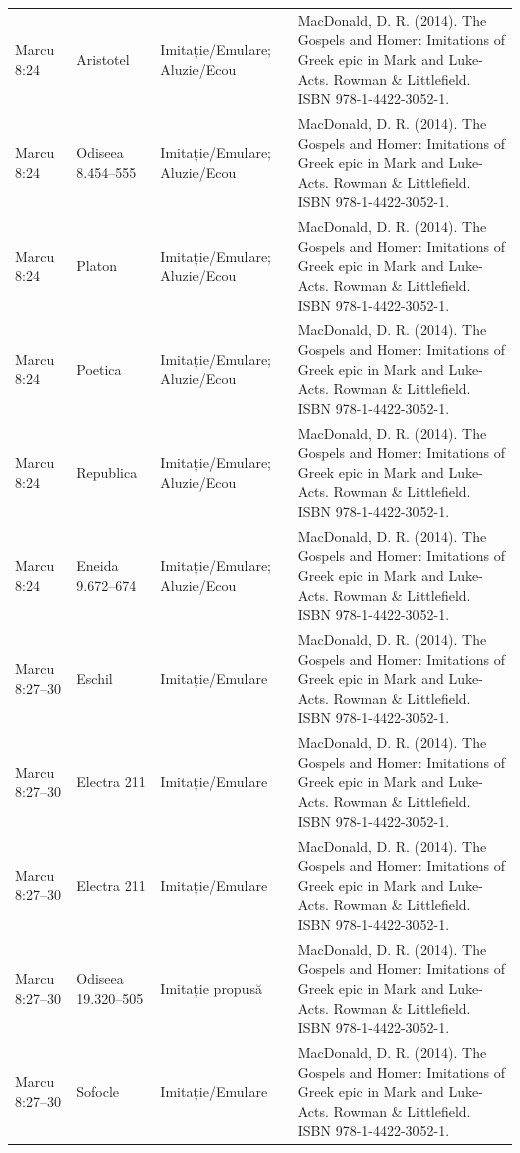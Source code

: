 \documentclass[12pt,a4paper,twoside,openany]{book}
\begin{document}
\begin{longtable}{L{1.4cm}L{1.7cm}L{3.1cm}L{8.4cm}}
Marcu 8:24 & Aristotel & Imitație/Emulare; Aluzie/Ecou & MacDonald, D. R. (2014). The Gospels and Homer: Imitations of Greek epic in Mark and Luke-Acts. Rowman \& Littlefield. ISBN 978-1-4422-3052-1. \\
Marcu 8:24 & Odiseea 8.454–555 & Imitație/Emulare; Aluzie/Ecou & MacDonald, D. R. (2014). The Gospels and Homer: Imitations of Greek epic in Mark and Luke-Acts. Rowman \& Littlefield. ISBN 978-1-4422-3052-1. \\
Marcu 8:24 & Platon & Imitație/Emulare; Aluzie/Ecou & MacDonald, D. R. (2014). The Gospels and Homer: Imitations of Greek epic in Mark and Luke-Acts. Rowman \& Littlefield. ISBN 978-1-4422-3052-1. \\
Marcu 8:24 & Poetica & Imitație/Emulare; Aluzie/Ecou & MacDonald, D. R. (2014). The Gospels and Homer: Imitations of Greek epic in Mark and Luke-Acts. Rowman \& Littlefield. ISBN 978-1-4422-3052-1. \\
Marcu 8:24 & Republica & Imitație/Emulare; Aluzie/Ecou & MacDonald, D. R. (2014). The Gospels and Homer: Imitations of Greek epic in Mark and Luke-Acts. Rowman \& Littlefield. ISBN 978-1-4422-3052-1. \\
Marcu 8:24 & Eneida 9.672–674 & Imitație/Emulare; Aluzie/Ecou & MacDonald, D. R. (2014). The Gospels and Homer: Imitations of Greek epic in Mark and Luke-Acts. Rowman \& Littlefield. ISBN 978-1-4422-3052-1. \\
Marcu 8:27–30 & Eschil & Imitație/Emulare & MacDonald, D. R. (2014). The Gospels and Homer: Imitations of Greek epic in Mark and Luke-Acts. Rowman \& Littlefield. ISBN 978-1-4422-3052-1. \\
Marcu 8:27–30 & Electra 211 & Imitație/Emulare & MacDonald, D. R. (2014). The Gospels and Homer: Imitations of Greek epic in Mark and Luke-Acts. Rowman \& Littlefield. ISBN 978-1-4422-3052-1. \\
Marcu 8:27–30 & Electra 211 & Imitație/Emulare & MacDonald, D. R. (2014). The Gospels and Homer: Imitations of Greek epic in Mark and Luke-Acts. Rowman \& Littlefield. ISBN 978-1-4422-3052-1. \\
Marcu 8:27–30 & Odiseea 19.320–505 & Imitație propusă & MacDonald, D. R. (2014). The Gospels and Homer: Imitations of Greek epic in Mark and Luke-Acts. Rowman \& Littlefield. ISBN 978-1-4422-3052-1. \\
Marcu 8:27–30 & Sofocle & Imitație/Emulare & MacDonald, D. R. (2014). The Gospels and Homer: Imitations of Greek epic in Mark and Luke-Acts. Rowman \& Littlefield. ISBN 978-1-4422-3052-1. \\

\end{longtable}
\end{document}
